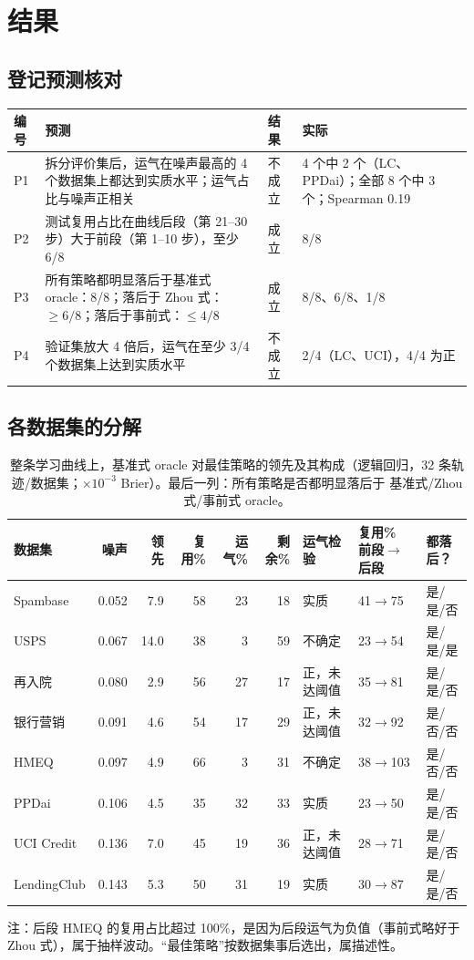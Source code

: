 \documentclass[11pt,a4paper]{article}
\newcommand{\ok}{\textcolor{green!45!black}{成立}}
\newcommand{\nok}{\textcolor{red!70!black}{不成立}}
\begin{document}
\section{结果}
\subsection{登记预测核对}
\begin{table}[H]
\centering\small
\begin{tabular}{L{1.0cm}L{8.2cm}L{1.8cm}L{3.6cm}}
\toprule
编号 & 预测 & 结果 & 实际 \\
\midrule
P1 & 拆分评价集后，运气在噪声最高的 4 个数据集上都达到实质水平；运气占比与噪声正相关 & \nok & 4 个中 2 个（LC、PPDai）；全部 8 个中 3 个；Spearman 0.19 \\
P2 & 测试复用占比在曲线后段（第 21--30 步）大于前段（第 1--10 步），至少 6/8 & \ok & 8/8 \\
P3 & 所有策略都明显落后于基准式 oracle：8/8；落后于 Zhou 式：$\ge6/8$；落后于事前式：$\le4/8$ & \ok & 8/8、6/8、1/8 \\
P4 & 验证集放大 4 倍后，运气在至少 3/4 个数据集上达到实质水平 & \nok & 2/4（LC、UCI），4/4 为正 \\
\bottomrule
\end{tabular}
\end{table}

\subsection{各数据集的分解}
\begin{table}[H]
\centering\small
\footnotesize\caption{整条学习曲线上，基准式 oracle 对最佳策略的领先及其构成（逻辑回归，32 条轨迹/数据集；$\times10^{-3}$ Brier）。最后一列：所有策略是否都明显落后于 基准式/Zhou 式/事前式 oracle。}
\setlength{\tabcolsep}{3pt}
\begin{tabular}{lrrrrrlll}
\toprule
数据集 & 噪声 & 领先 & 复用\% & 运气\% & 剩余\% & 运气检验 & 复用\% 前段$\to$后段 & 都落后？ \\
\midrule
Spambase & 0.052 & 7.9 & 58 & 23 & 18 & 实质 & 41$\to$75 & 是/是/否 \\
USPS & 0.067 & 14.0 & 38 & 3 & 59 & 不确定 & 23$\to$54 & 是/是/是 \\
再入院 & 0.080 & 2.9 & 56 & 27 & 17 & 正，未达阈值 & 35$\to$81 & 是/是/否 \\
银行营销 & 0.091 & 4.6 & 54 & 17 & 29 & 正，未达阈值 & 32$\to$92 & 是/否/否 \\
HMEQ & 0.097 & 4.9 & 66 & 3 & 31 & 不确定 & 38$\to$103 & 是/否/否 \\
PPDai & 0.106 & 4.5 & 35 & 32 & 33 & 实质 & 23$\to$50 & 是/是/否 \\
UCI Credit & 0.136 & 7.0 & 45 & 19 & 36 & 正，未达阈值 & 28$\to$71 & 是/是/否 \\
LendingClub & 0.143 & 5.3 & 50 & 31 & 19 & 实质 & 30$\to$87 & 是/是/否 \\
\bottomrule
\end{tabular}
\end{table}
\noindent 注：后段 HMEQ 的复用占比超过 100\%，是因为后段运气为负值（事前式略好于 Zhou 式），属于抽样波动。“最佳策略”按数据集事后选出，属描述性。
\end{document}
